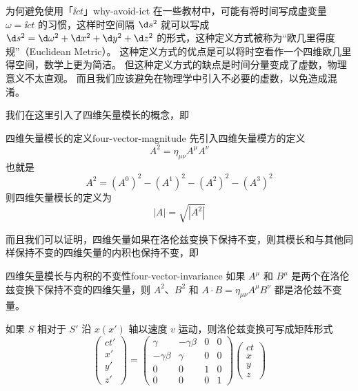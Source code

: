 \begin{note}{为何避免使用「$\ii ct$」}{why-avoid-ict}
    在一些教材中，可能有将时间写成虚变量 $\omega = \ii c t$ 的习惯，这样时空间隔 $\d s^2$ 就可以写成 $\d s^2 = \d \omega^2 + \d x^2 + \d y^2 + \d z^2$ 的形式，这种定义方式被称为“欧几里得度规”（Euclidean Metric）。
    这种定义方式的优点是可以将时空看作一个四维欧几里得空间，数学上更为简洁。
    但这种定义方式的缺点是时间分量变成了虚数，物理意义不太直观。
    而且我们应该避免在物理学中引入不必要的虚数，以免造成混淆。
\end{note}

我们在这里引入了四维矢量模长的概念，即
\begin{definition}{四维矢量模长的定义}{four-vector-magnitude}
    先引入四维矢量模方的定义
    \begin{equation}
        A^2 = \eta_{\mu \nu} A^\mu A^\nu
    \end{equation}
    也就是
    \begin{equation}
        A^2 = (A^0)^2 - (A^1)^2 - (A^2)^2 - (A^3)^2
    \end{equation}
    则四维矢量模长的定义为
    \begin{equation}
        |A| = \sqrt{|A^2|}
    \end{equation}
\end{definition}

而且我们可以证明，四维矢量如果在洛伦兹变换下保持不变，则其模长和与其他同样保持不变的四维矢量的内积也保持不变，即
\begin{theorem}{四维矢量模长与内积的不变性}{four-vector-invariance}
    如果 $A^\mu$ 和 $B^\mu$ 是两个在洛伦兹变换下保持不变的四维矢量，则 $A^2$、$B^2$ 和 $A \cdot B = \eta_{\mu \nu} A^\mu B^\nu$ 都是洛伦兹不变量。
\end{theorem}

如果 $S$ 相对于 $S'$ 沿 $x(x')$ 轴以速度 $v$ 运动，则洛伦兹变换可写成矩阵形式
\begin{equation}
    \begin{pmatrix}
        ct' \\
        x'  \\
        y'  \\
        z'
    \end{pmatrix} = \begin{pmatrix}
        \gamma        & -\gamma \beta & 0 & 0 \\
        -\gamma \beta & \gamma        & 0 & 0 \\
        0             & 0             & 1 & 0 \\
        0             & 0             & 0 & 1
    \end{pmatrix} \begin{pmatrix}
        ct \\
        x  \\
        y  \\
        z
    \end{pmatrix}
\end{equation}


